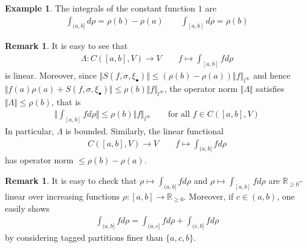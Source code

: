 \documentclass[12pt,b5paper,notitlepage]{article}
\theoremstyle{definition}
\newtheorem{eg}[df]{Example}
\newtheorem{rem}[df]{Remark}
\theoremstyle{plain}
\newcommand{\blt}{\bullet}
\newcommand{\Rbb}{\mathbb R}
\newcommand{\dps}{\displaystyle}
\numberwithin{equation}{section}
\begin{document}
\begin{eg}\label{lb71}
The integrals of the constant function $1$ are
\begin{align*}
\int_{(a,b]}d\rho=\rho(b)-\rho(a)\qquad \int_{[a,b]}d\rho=\rho(b)
\end{align*}
\end{eg}

\begin{comment}
\begin{eg}\label{lb68}
Suppose that $\rho|_{(a,b]}=1$. Then
\begin{align*}
\int_{(a,b]}fd\rho=f(a)(1-\rho(a))\qquad \int_{[a,b]}fd\rho=f(a)
\end{align*}
In particular, if $\rho|_{[a,b]}=1$, then $\dps\int_{(a,b]}fd\rho=0$ and $\dps\int_{[a,b]}fd\rho=f(a)$.
\end{eg}
\end{comment}






\begin{rem}\label{lb65}
It is easy to see that 
\begin{align*}
\Lambda:C([a,b],V)\rightarrow V\qquad f\mapsto \int_{[a,b]}fd\rho
\end{align*}
is linear. Moreover, since $\Vert S(f,\sigma,\xi_\blt)\Vert\leq (\rho(b)-\rho(a))\Vert f\Vert_{l^\infty}$ and hence $\Vert f(a)\rho(a)+ S(f,\sigma,\xi_\blt)\Vert\leq \rho(b)\Vert f\Vert_{l^\infty}$, the operator norm $\Vert\Lambda\Vert$ satisfies $\Vert\Lambda\Vert\leq \rho(b)$, that is
\begin{align*}
\Big\Vert\int_{[a,b]}fd\rho\Big\Vert\leq \rho(b)\Vert f\Vert_{l^\infty}\qquad\text{for all }f\in C([a,b],V)
\end{align*}
In particular, $\Lambda$ is bounded. Similarly, the linear functional
\begin{align*}
C([a,b],V)\rightarrow V\qquad f\mapsto \int_{(a,b]}fd\rho
\end{align*}
has operator norm $\leq\rho(b)-\rho(a)$.
\end{rem}

\begin{rem}\label{lb6}
It is easy to check that $\rho\mapsto\int_{(a,b]} fd\rho$ and $\rho\mapsto\int_{[a,b]} fd\rho$ are $\Rbb_{\geq0}$-linear over increasing functions $\rho:[a,b]\rightarrow\Rbb_{\geq0}$. Moreover, if $c\in(a,b)$, one easily shows
\begin{align}
\int_{(a,b]}fd\rho=\int_{(a,c]}fd\rho+\int_{(c,b]}fd\rho
\end{align}
by considering tagged partitions finer than $\{a,c,b\}$.
\end{rem}
\end{document}
